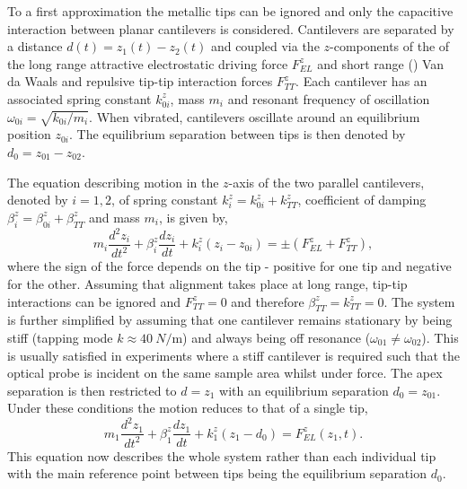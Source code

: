 \documentclass{article}
\begin{document}
To a first approximation the metallic tips can be ignored and only the capacitive interaction between planar cantilevers is considered. Cantilevers are separated by a distance $d(t) = z_1(t) - z_2(t)$ and coupled via the $z$-components of the of the long range attractive electrostatic driving force $F_{EL}^z$ and short range () Van da Waals and repulsive tip-tip interaction forces $F_{TT}^z$. Each cantilever has an associated spring constant $k_{0i}^z$, mass $m_i$ and resonant frequency of oscillation $\omega_{0i} = \sqrt{k_{0i}/m_i}$. When vibrated, cantilevers oscillate around an equilibrium position $z_{0i}$. The equilibrium separation between tips is then denoted by $d_0 = z_{01} - z_{02}$.

The equation describing motion in the $z$-axis of the two parallel cantilevers, denoted by $i=1,2$, of spring constant $k_i^z=k_{0i}^z+k_{TT}^z$, coefficient of damping $\beta_i^z=\beta_{0i}^z+\beta_{TT}^z$ and mass $m_i$, is given by,
\begin{equation}
m_i\frac{d^2z_i}{dt^2}+\beta_i^z\frac{dz_i}{dt}+k_i^z\left(z_i-z_{0i}\right)=\pm\left(F_{EL}^z+F_{TT}^z\right),
\end{equation}
where the sign of the force depends on the tip - positive for one tip and negative for the other.
Assuming that alignment takes place at long range, tip-tip interactions can be ignored and $F_{TT}^z = 0$ and therefore $\beta_{TT}^{z} = k_{TT}^{z} = 0$. The system is further simplified by assuming that one cantilever remains stationary by being stiff (tapping mode $k\approx\SI{40}{N\per\metre}$) and always being off resonance ($\omega_{01} \neq \omega_{02}$). This is usually satisfied in experiments where a stiff cantilever is required such that the optical probe is incident on the same sample area whilst under force. The apex separation is then restricted to $d=z_1$ with an equilibrium separation $d_0 = z_{01}$. Under these conditions the motion reduces to that of a single tip,
\begin{equation}
m_1\frac{d^2z_1}{dt^2}+\beta_1^z\frac{dz_1}{dt}+k_1^z\left(z_1-d_0\right) = F_{EL}^z(z_1, t).
\label{eq:simple_eom}
\end{equation}
This equation now describes the whole system rather than each individual tip with the main reference point between tips being the equilibrium separation $d_0$.
\end{document}
